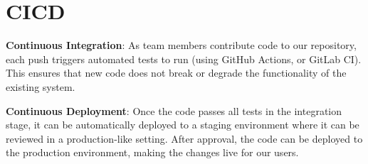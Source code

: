 \documentclass{article}
\begin{document}
\section{CICD}

\textbf{Continuous Integration}: As team members contribute code to our repository, each push triggers automated tests to run (using GitHub Actions, or GitLab CI). This ensures that new code does not break or degrade the functionality of the existing system.

\textbf{Continuous Deployment}: Once the code passes all tests in the integration stage, it can be automatically deployed to a staging environment where it can be reviewed in a production-like setting. After approval, the code can be deployed to the production environment, making the changes live for our users.
\end{document}
